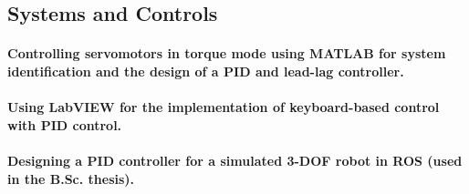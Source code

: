 \documentclass[a4paper]{article}
\begin{document}
        \subsection{Systems and Controls}
            \paragraph{Controlling servomotors in torque mode using MATLAB for system identification and the design of a PID and lead-lag controller.}
            \paragraph{Using LabVIEW for the implementation of keyboard-based control with PID control.}
            \paragraph{Designing a PID controller for a simulated 3-DOF robot in ROS (used in the B.Sc. thesis).} %
\end{document}
